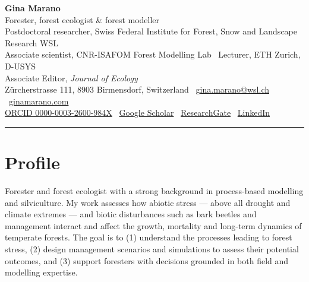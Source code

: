 \documentclass[10pt,a4paper]{article}
\begin{document}
{\serifhead\bfseries\fontsize{24}{27}\selectfont Gina Marano}\\[3pt]
{\normalsize\color{inksoft}Forester, forest ecologist \& forest modeller}\\[2pt]
{\small\color{muted}Postdoctoral researcher, Swiss Federal Institute for Forest, Snow and Landscape Research WSL\\
Associate scientist, CNR-ISAFOM Forest Modelling Lab \textperiodcentered\ Lecturer, ETH Zurich, D-USYS\\
Associate Editor, \emph{Journal of Ecology}}\\[5pt]
{\footnotesize\color{muted}Z\"urcherstrasse 111, 8903 Birmensdorf, Switzerland \textperiodcentered\ \href{mailto:gina.marano@wsl.ch}{gina.marano@wsl.ch} \textperiodcentered\ \href{https://ginamarano.com}{ginamarano.com}\\
\href{https://orcid.org/0000-0003-2600-984X}{ORCID 0000-0003-2600-984X} \textperiodcentered\ \href{https://scholar.google.com/citations?user=OOLvF6kAAAAJ}{Google Scholar} \textperiodcentered\ \href{https://www.researchgate.net/profile/Gina-Marano}{ResearchGate} \textperiodcentered\ \href{https://www.linkedin.com/in/gina-marano-60a66270/}{LinkedIn}}

\vspace{6pt}
{\color{rule}\rule{\linewidth}{0.8pt}}
\vspace{4pt}

\section*{Profile}
{\small\color{inksoft}Forester and forest ecologist with a strong background in process-based modelling and silviculture. My work assesses how abiotic stress --- above all drought and climate extremes --- and biotic disturbances such as bark beetles and management interact and affect the growth, mortality and long-term dynamics of temperate forests. The goal is to (1) understand the processes leading to forest stress, (2) design management scenarios and simulations to assess their potential outcomes, and (3) support foresters with decisions grounded in both field and modelling expertise.}
\end{document}
